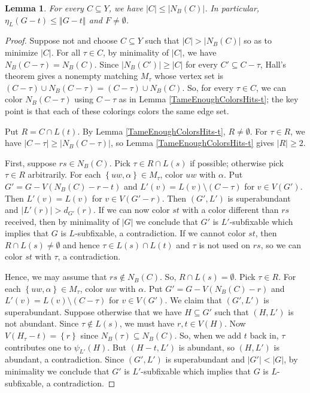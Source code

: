 \documentclass[12pt]{article}
\theoremstyle{plain}
\newtheorem{lem}[thm]{Lemma}
\theoremstyle{definition}
\theoremstyle{remark}
\newcommand{\set}[1]{\left\{ #1 \right\}}
\newcommand{\card}[1]{\left|#1\right|}
\newcommand{\size}[1]{\left\Vert#1\right\Vert}
\begin{document}
	\begin{lem}\label{NoPositiveSurplus}
		For every $C \subseteq Y$, we have $\card{C} \le \card{N_B(C)}$. In particular, $\eta_L(G-t) \le \size{G-t}$ and $F \ne \emptyset$.
	\end{lem}
	\begin{proof}
			Suppose not and choose $C \subseteq Y$ such that $\card{C} > \card{N_B(C)}$ so as to minimize $\card{C}$.  For all $\tau \in C$, by minimality of $\card{C}$, we have $N_B(C - \tau) = N_B(C)$.  Since $\card{N_B(C')} \ge \card{C}$ for every $C' \subseteq C - \tau$, Hall's theorem gives a nonempty matching $M_\tau$ whose vertex set is $(C - \tau) \cup N_B(C-\tau) = (C - \tau) \cup N_B(C)$.  So, for every $\tau \in C$, we can color $N_B(C - \tau)$ using $C - \tau$ as in Lemma \ref{TameEnoughColorsHits-t}; the key point is that each of these colorings colors the same edge set.
			
			Put $R = C \cap L(t)$.  By Lemma \ref{TameEnoughColorsHits-t}, $R \ne \emptyset$.  For $\tau \in R$, we have $\card{C - \tau} \ge \card{N_B(C - \tau)}$, so Lemma \ref{TameEnoughColorsHits-t} gives $\card{R} \ge 2$. 
			
			First, suppose $rs \in N_B(C)$. Pick $\tau \in R \cap L(s)$ if possible; otherwise pick $\tau \in R$ arbitrarily. For each $\set{uw, \alpha} \in M_\tau$, color $uw$ with $\alpha$.  Put $G' = G - V(N_B(C) - r - t)$ and $L'(v) = L(v) \setminus (C - \tau)$ for $v \in V(G')$.  Then $L'(v) = L(v)$ for $v \in V(G' - r)$. Then $(G', L')$ is superabundant and $|L'(r)| > d_{G'}(r)$. If we can now color $st$ with a color different than $rs$ received, then by minimality of $|G|$ we conclude that $G'$ is $L'$-subfixable which implies that $G$ is $L$-subfixable, a contradiction. If we cannot color $st$, then $R \cap L(s) \ne \emptyset$ and hence $\tau \in L(s) \cap L(t)$ and $\tau$ is not used on $rs$, so we can color $st$ with $\tau$, a contradiction.  
					
			Hence, we may assume that $rs \not \in N_B(C)$. So, $R \cap L(s) = \emptyset$. Pick $\tau \in R$. For each $\set{uw, \alpha} \in M_\tau$, color $uw$ with $\alpha$.  Put $G' = G - V(N_B(C) - r)$ and $L'(v) = L(v) \setminus (C - \tau)$ for $v \in V(G')$.  We claim that $(G', L')$ is superabundant.  Suppose otherwise that we have $H \subseteq G'$ such that $(H, L')$ is not abundant. Since $\tau \not \in L(s)$, we must have $r, t \in V(H)$.  Now $V(H_\tau - t) = \set{r}$ since $N_B(\tau) \subseteq N_B(C)$.  So, when we add $t$ back in, $\tau$ contributes one to $\psi_{L'}(H)$.  But $(H - t, L')$ is abundant, so $(H, L')$ is abundant, a contradiction.  Since $(G', L')$ is superabundant and $\card{G'} < \card{G}$, by minimality we conclude that $G'$ is $L'$-subfixable which implies that $G$ is $L$-subfixable, a contradiction.
	\end{proof}
\end{document}
